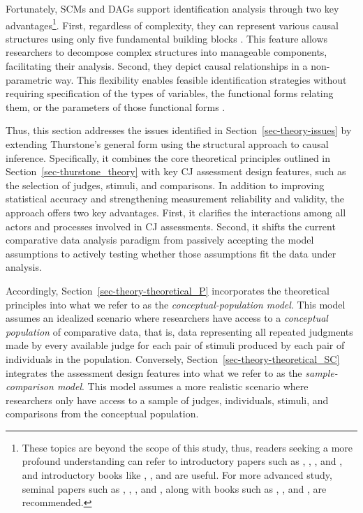 \documentclass[
  authoryear,
  review,
  1p]{elsarticle}
\begin{document}
Fortunately, SCMs and DAGs support identification analysis through two
key advantages\footnote{These topics are beyond the scope of this study,
  thus, readers seeking a more profound understanding can refer to
  introductory papers such as \citet{Pearl_2010}, \citet{Rohrer_2018},
  \citet{Pearl_2019}, and \citet{Cinelli_et_al_2020}, and introductory
  books like \citet{Pearl_et_al_2018}, \citet{Neal_2020}, and
  \citet{McElreath_2020} are useful. For more advanced study, seminal
  papers such as \citet{Neyman_et_al_1923}, \citet{Rubin_1974},
  \citet{Spirtes_et_al_1991}, and \citet{Sekhon_2009}, along with books
  such as \citet{Pearl_2009}, \citet{Morgan_et_al_2014}, and
  \citet{Hernan_et_al_2025}, are recommended.}. First, regardless of
complexity, they can represent various causal structures using only five
fundamental building blocks \citep{Neal_2020, McElreath_2024}. This
feature allows researchers to decompose complex structures into
manageable components, facilitating their analysis. Second, they depict
causal relationships in a non-parametric way. This flexibility enables
feasible identification strategies without requiring specification of
the types of variables, the functional forms relating them, or the
parameters of those functional forms \citep{Pearl_et_al_2016}.

Thus, this section addresses the issues identified in
Section~\ref{sec-theory-issues} by extending Thurstone's general form
using the structural approach to causal inference. Specifically, it
combines the core theoretical principles outlined in
Section~\ref{sec-thurstone_theory} with key CJ assessment design
features, such as the selection of judges, stimuli, and comparisons. In
addition to improving statistical accuracy and strengthening measurement
reliability and validity, the approach offers two key advantages. First,
it clarifies the interactions among all actors and processes involved in
CJ assessments. Second, it shifts the current comparative data analysis
paradigm from passively accepting the model assumptions to actively
testing whether those assumptions fit the data under analysis.

Accordingly, Section~\ref{sec-theory-theoretical_P} incorporates the
theoretical principles into what we refer to as the
\emph{conceptual-population model}. This model assumes an idealized
scenario where researchers have access to a \emph{conceptual population}
of comparative data, that is, data representing all repeated judgments
made by every available judge for each pair of stimuli produced by each
pair of individuals in the population. Conversely,
Section~\ref{sec-theory-theoretical_SC} integrates the assessment design
features into what we refer to as the \emph{sample-comparison model}.
This model assumes a more realistic scenario where researchers only have
access to a sample of judges, individuals, stimuli, and comparisons from
the conceptual population.
\end{document}
